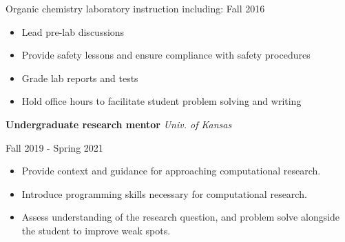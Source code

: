 \vspace{\y}
Organic chemistry laboratory instruction including: \hfill Fall 2016
\begin{itemize}[rightmargin=\dimexpr\linewidth-10cm-\leftmargin\relax,noitemsep,topsep=0cm]
\raggedright
  \item Lead pre-lab discussions
  \item Provide safety lessons and ensure compliance with safety procedures
  \item Grade lab reports and tests
  \item Hold office hours to facilitate student problem solving and writing
\end{itemize}


\vspace{\y}
{\bf Undergraduate research mentor} \hfill \textit{Univ. of Kansas}

\hfill Fall 2019 - Spring 2021

\begin{itemize}[rightmargin=\dimexpr\linewidth-10cm-\leftmargin\relax,noitemsep,topsep=0cm]
\raggedright
  \item Provide context and guidance for approaching computational research.
  \item Introduce programming skills necessary for computational research.
  \item Assess understanding of the research question, and problem solve alongside the student to improve weak spots.
\end{itemize}
